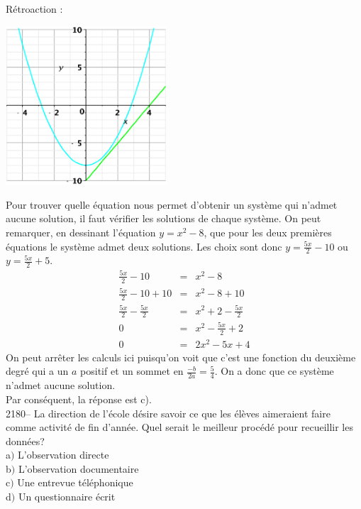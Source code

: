 \documentclass[letterpaper, 12pt]{article}
\begin{document}
R\'etroaction :\\
\begin{center}
 \includegraphics[width=6cm,bb=20 118 575 673]{Q2179.eps}
\end{center}
Pour trouver quelle \'equation nous permet d'obtenir un syst\`eme qui n'admet aucune solution, il faut v\'erifier les solutions de chaque syst\`eme. On peut remarquer, en dessinant l'\'equation $y=x^{2}-8$, que pour les deux premi\`eres \'equations le syst\`eme admet deux solutions. Les choix sont donc $y=\frac{5x}{2}-10$ ou $y=\frac{5x}{2}+5$.
\begin{eqnarray*}
\frac{5x}{2}-10&=&x^{2}-8\\
\frac{5x}{2}-10+10&=&x^{2}-8+10\\
\frac{5x}{2}-\frac{5x}{2}&=&x^{2}+2-\frac{5x}{2}\\
0&=&x^{2}-\frac{5x}{2}+2\\
0&=&2x^{2}-5x+4
\end{eqnarray*}
On peut arr\^eter les calculs ici puisqu'on voit que c'est une fonction du deuxi\`eme degr\'e qui a un $a$ positif et un sommet en $\frac{-b}{2a}=\frac{5}{4}$. On a donc que ce syst\`eme n'admet aucune solution.\\
Par cons\'equent, la r\'eponse est c).\\





2180-- La direction de l'\'ecole d\'esire savoir ce que les \'el\`eves aimeraient faire comme activit\'e de fin d'ann\'ee. Quel serait le meilleur proc\'ed\'e pour recueillir les donn\'ees?\\

a$)$ L'observation directe\\
b$)$ L'observation documentaire\\
c$)$ Une entrevue t\'el\'ephonique\\
d$)$ Un questionnaire \'ecrit\\
\end{document}
